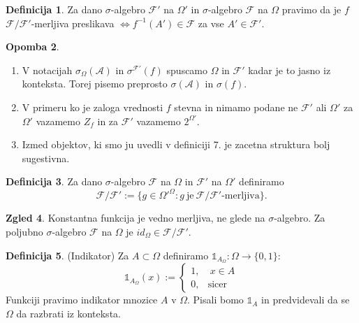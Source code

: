 \documentclass[a4paper,12pt]{article}
\theoremstyle{definition} %
\newtheorem{definicija}{Definicija}[section]
\newtheorem{zgled}[definicija]{Zgled}
\newtheorem{opomba}[definicija]{Opomba}
\theoremstyle{plain} %
\newcommand{\F}{\mathcal{F}}
\newcommand{\A}{\mathcal{A}}
\begin{document}
            \begin{definicija}
                Za dano $\sigma$-algebro $\F'$ na $\Omega'$ in $\sigma$-algebro $\F$ na $\Omega$ pravimo da je $f$ $\F/\F'$-merljiva preslikava $\iff f^{-1}(A')\in \F$ za vse $A' \in \F'$.
            \end{definicija}

            \begin{opomba}
                \begin{enumerate}
                    \item V notacijah $\sigma_\Omega(\A)$ in $\sigma^{\F'}(f)$ spuscamo $\Omega$ in $\F'$ kadar je to jasno iz konteksta. Torej pisemo preprosto $\sigma(\A)$ in $\sigma(f)$.
                    \item V primeru ko je zaloga vrednosti $f$ stevna in nimamo podane ne $\F'$ ali $\Omega'$ za $\Omega'$ vazamemo $Z_f$ in za $\F'$ vazamemo $2^{\Omega'}$.
                    \item Izmed objektov, ki smo ju uvedli v definiciji 7. je zacetna struktura bolj sugestivna.
                \end{enumerate}
            \end{opomba}

            \begin{definicija}
                Za dano $\sigma$-algebro $\F$ na $\Omega$ in $\F'$ na $\Omega'$ definiramo $$\F/\F':= \{g \in \Omega'^\Omega: g \ \text{je} \ \F/\F'\text{-merljiva}\}.$$
            \end{definicija}

            \begin{zgled}
                Konstantna funkcija je vedno merljiva, ne glede na $\sigma$-algebro. Za poljubno $\sigma$-algebro $\F$ na $\Omega$ je $id_\Omega \in \F/\F'$.
            \end{zgled}

            \begin{definicija}(Indikator)
                Za $A \subset \Omega$ definiramo $\mathds{1}_{A_\Omega}:\Omega\rightarrow\{0, 1\}$:
                $$\mathds{1}_{A_\Omega}(x) := 
                    \begin{cases}
                        1, & \ x \in A \\
                        0, & \text{sicer}
                    \end{cases}$$
                Funkciji pravimo indikator mnozice $A$ v $\Omega$. Pisali bomo $\mathds{1}_A$ in predvidevali da se $\Omega$ da razbrati iz konteksta.
            \end{definicija}
\end{document}
